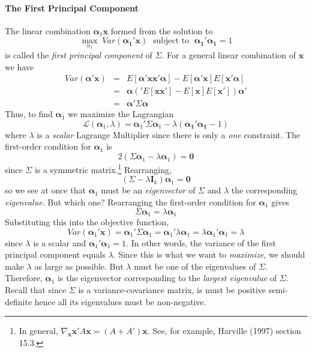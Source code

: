 \paragraph{The First Principal Component} The linear combination $\boldsymbol{\alpha}_1 \mathbf{x}$ formed from the solution to
	$$\max_{\alpha_1} \; Var(\boldsymbol{\alpha_1}'\mathbf{x})\;  \mbox{ subject to } \; \boldsymbol{\alpha_1}' \boldsymbol{\alpha_1} = 1$$
is called the \emph{first principal component} of $\Sigma$. For a general linear combination of $\mathbf{x}$ we have
	\begin{eqnarray*}
		Var(\boldsymbol{\alpha}'\mathbf{x}) &=& E[\boldsymbol{\alpha}'\mathbf{x}\mathbf{x}'\boldsymbol{\alpha}] - E[\boldsymbol{\alpha}'\mathbf{x}]E[\mathbf{x}'\boldsymbol{\alpha}]\\
			&=& \boldsymbol{\alpha}\left('E[\mathbf{x}\mathbf{x}'] - E[\mathbf{x}]E[\mathbf{x}'] \right)\boldsymbol{\alpha}'\\
			&=& \boldsymbol{\alpha}' \Sigma \boldsymbol{\alpha}
	\end{eqnarray*}
Thus, to find $\boldsymbol{\alpha}_1$ we maximize the Lagrangian
	$$\mathcal{L}(\boldsymbol{\alpha}_1 ,\lambda) = \boldsymbol{\alpha}_1'\Sigma \boldsymbol{\alpha}_1 - \lambda(\boldsymbol{\alpha_1}' \boldsymbol{\alpha_1}  - 1)$$
where $\lambda$ is a \emph{scalar} Lagrange Multiplier since there is only a \emph{one} constraint. The first-order condition for $\mathbf{\alpha}_1$ is
$$2(\Sigma \boldsymbol{\alpha}_1 - \lambda \boldsymbol{\alpha}_1) = \textbf{0}$$
since $\Sigma$ is a symmetric matrix.\footnote{In general, $\nabla_{\mathbf{x}} \mathbf{x}' A \mathbf{x} = (A + A')\mathbf{x}$. See, for example, Harville (1997) section 15.3.} Rearranging,
	$$(\Sigma - \lambda \textbf{I}_k)\boldsymbol{\alpha}_1 = \textbf{0}$$
so we see at once that $\boldsymbol{\alpha}_1$ must be an \emph{eigenvector} of $\Sigma$ and $\lambda$ the corresponding \emph{eigenvalue}. But which one? Rearranging the first-order condition for $\boldsymbol{\alpha}_1$ gives
	$$\Sigma \boldsymbol{\alpha}_1 = \lambda \boldsymbol{\alpha}_1$$
Substituting this into the objective function, 
	$$Var(\boldsymbol{\alpha}_1' \textbf{x}) =  \boldsymbol{\alpha}_1' \Sigma \boldsymbol{\alpha}_1 = \boldsymbol{\alpha}_1' \lambda \boldsymbol{\alpha}_1 = \lambda \boldsymbol{\alpha}_1' \boldsymbol{\alpha}_1 = \lambda$$
since $\lambda$ is a scalar and $\boldsymbol{\alpha}_1' \boldsymbol{\alpha}_1 = 1$. In other words, the variance of the first principal component equals $\lambda$. Since this is what we want to \emph{maximize}, we should make $\lambda$ as large as possible. But $\lambda$ must be one of the eigenvalues of $\Sigma$. Therefore, $\boldsymbol{\alpha}_1$ is the eigenvector corresponding to the \emph{largest eigenvalue} of $\Sigma$. Recall that since $\Sigma$ is a variance-covariance matrix, is must be positive semi-definite hence all its eigenvalues must be non-negative.

